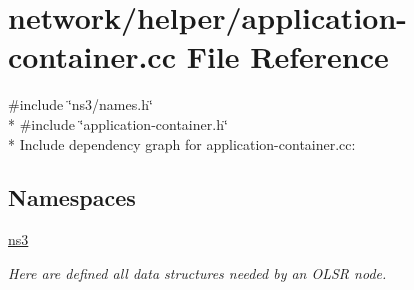 \hypertarget{application-container_8cc}{}\section{network/helper/application-\/container.cc File Reference}
\label{application-container_8cc}
{\ttfamily \#include \char`\"{}ns3/names.\+h\char`\"{}}\\*
{\ttfamily \#include \char`\"{}application-\/container.\+h\char`\"{}}\\*
Include dependency graph for application-\/container.cc\+:
\subsection*{Namespaces}
\begin{DoxyCompactItemize}
\item 
 \hyperlink{namespacens3}{ns3}
\begin{DoxyCompactList}\small\item\em Here are defined all data structures needed by an O\+L\+SR node. \end{DoxyCompactList}\end{DoxyCompactItemize}
